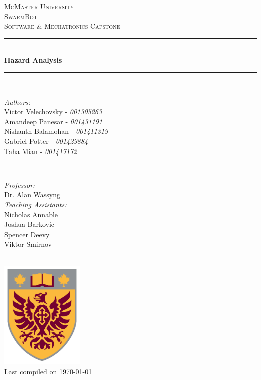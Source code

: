 \documentclass[11pt]{article}
\begin{document}
\newcommand{\PROJECTNAME}{SwarmBot}

\begin{titlepage}
	\newcommand{\HRule}{\rule{\linewidth}{0.2mm}}
	\begin{center}
	\textsc{\LARGE McMaster University}\\[1.5cm]

	\textsc{\Large \PROJECTNAME}\\[0.5cm]
	\textsc{\large Software \& Mechatronics Capstone}\\[0.5cm]

	\HRule\\[0.4cm]
		{\huge\bfseries Hazard Analysis}\\[0.4cm]
	\HRule\\[0.4cm]

	\begin{minipage}[t][][t]{0.5\textwidth}
		\begin{flushleft} \large
			\emph{Authors:}\\
			Victor Velechovsky - \textit{001305263} \\
			Amandeep Panesar - \textit{001431191} \\ 
			Nishanth Balamohan - \textit{001411319}\\
			Gabriel Potter - \textit{001429884}\\
			Taha Mian  - \textit{001417172}\\
		\end{flushleft}
	\end{minipage}
	~
	\begin{minipage}[t][][t]{0.4\textwidth}
		\begin{flushright} \large
			\emph{Professor:} \\
			Dr. Alan Wassyng \\[0.4cm]
			\emph{Teaching Assistants:} \\
			Nicholas Annable \\
			Joshua Barkovic \\
			Spencer Deevy \\
			Viktor Smirnov
		\end{flushright}
	\end{minipage}\\[2cm]

	\includegraphics[width=0.3\textwidth]{logo.png} \\
	{\large Last compiled on \today}
	\end{center}

\end{titlepage}
\end{document}

